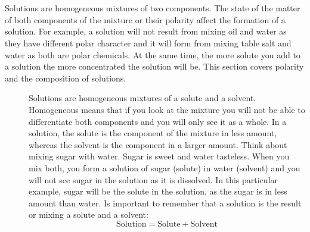 \documentclass[main.tex]{subfiles} %
\begin{document}
\section{\color{blue!30!black}{Solutions and composition}}
Solutions are homogeneous mixtures of two components. The state of the matter of both components of the mixture or their polarity affect the formation of a solution. For example, a solution will not result from mixing oil and water as they have different polar character and it will form from mixing table salt and water as both are polar chemicals. At the same time, the more solute you add to a solution the more concentrated the solution will be. This section covers polarity and the composition of solutions. 
\sloppy
\begin{description}
\item[] Solutions are homogeneous mixtures of a solute and a solvent. Homogeneous means that if you look at the mixture you will not be able to differentiate both components and you will only see it as a whole. In a solution, the solute is the component of the mixture in less amount, whereas the solvent is the component in a larger amount. Think about mixing sugar with water. Sugar is sweet and water tasteless. When you mix both, you form a solution of sugar (solute) in water (solvent) and you will not see sugar in the solution as it is dissolved. In this particular example, sugar will be the solute in the solution, as the sugar is in less amount than water. Is important to remember that a solution is the result or mixing a solute and a solvent:
\begin{equation*}
\boxed{ \text{Solution}=\text{Solute}+\text{Solvent} }   
\end{equation*}




\end{description}
\end{document}
